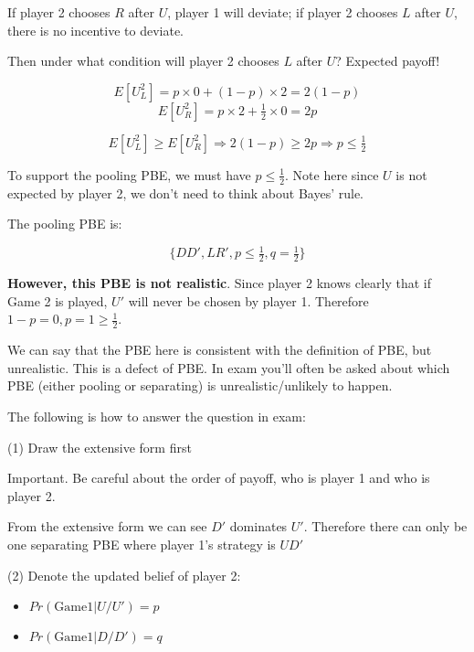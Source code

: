 \documentclass{article}
\begin{document}
\begin{mdframed}[backgroundcolor=blue!20,linecolor=white]
\medskip

If player 2 chooses $R$ after $U$, player 1 will deviate; if player 2 chooses $L$ after $U$, there is no incentive to deviate.

\medskip

Then under what condition will player 2 chooses $L$ after $U$? Expected payoff!

$$E[U^2_{L}] = p \times 0+ (1-p)\times 2 = 2(1-p)$$
$$E[U^2_{R}] = p \times 2+ \tfrac12 \times 0 = 2p$$

$$E[U^2_{L}] \ge E[U^2_{R}] \Rightarrow 2(1-p) \ge 2p \Rightarrow p \le \tfrac12$$

To support the pooling PBE, we must have $p \le \tfrac12$.
Note here since $U$ is not expected by player 2, we don't need to think about Bayes' rule.

\medskip

The pooling PBE is:

$$\{DD', LR', p \le \tfrac12, q = \tfrac12\}$$

\textbf{However, this PBE is not realistic}. Since player 2 knows clearly that if Game 2 is played, $U'$ will never be chosen by player 1. Therefore $1-p = 0, p =1 \ge \tfrac12$.

\medskip

We can say that the PBE here is consistent with the definition of PBE, but unrealistic. This is a defect of PBE. In exam you'll often be asked about which PBE (either pooling or separating) is unrealistic/unlikely to happen.

\medskip

The following is how to answer the question in exam:
\end{mdframed}


(1) Draw the extensive form first

\begin{mdframed}[backgroundcolor=yellow!20,linecolor=white]
Important. Be careful about the order of payoff, who is player 1 and who is player 2.
\end{mdframed}

From the extensive form we can see $D'$ dominates $U'$.
Therefore there can only be one separating PBE where player 1's strategy is $UD'$

(2) Denote the updated belief of player 2:
\begin{itemize}
\item $Pr(\text{Game1} | U/U') = p$
\item $Pr(\text{Game1} | D/D') = q$
\end{itemize}
\end{document}
